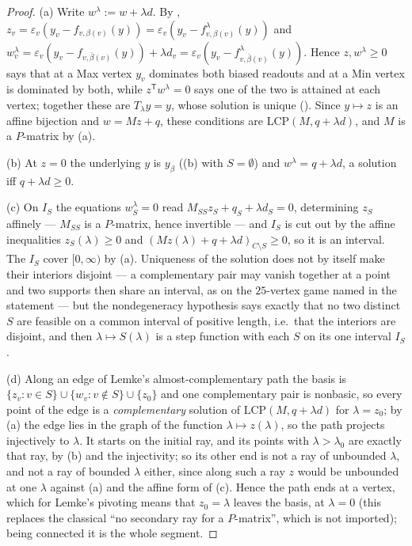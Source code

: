 \documentclass[11pt]{article}
\theoremstyle{plain}
\theoremstyle{definition}
\begin{document}
\begin{proof}
(a) Write $w^{\lambda}:=w+\lambda d$. By ,
$z_v=\varepsilon_v(y_v-f_{v,\beta(v)}(y))=
\varepsilon_v(y_v-f^{\lambda}_{v,\beta(v)}(y))$ and
$w^{\lambda}_v=\varepsilon_v(y_v-f_{v,\bar\beta(v)}(y))+\lambda d_v
=\varepsilon_v(y_v-f^{\lambda}_{v,\bar\beta(v)}(y))$. Hence
$z,w^\lambda\ge0$ says that at a Max vertex $y_v$ dominates both biased
readouts and at a Min vertex is dominated by both, while
$z^{\mathsf T}w^{\lambda}=0$ says one of the two is attained at each vertex;
together these are $T_\lambda y=y$, whose solution is unique
(). Since $y\mapsto z$ is an affine bijection and
$w=Mz+q$, these conditions are $\mathrm{LCP}(M,q+\lambda d)$, and $M$ is a
$P$-matrix by (a).

(b) At $z=0$ the underlying $y$ is $y_\beta$ ((b) with
$S=\emptyset$) and $w^{\lambda}=q+\lambda d$, a solution iff
$q+\lambda d\ge0$.

(c) On $I_S$ the equations $w^{\lambda}_S=0$ read
$M_{SS}z_S+q_S+\lambda d_S=0$, determining $z_S$ affinely --- $M_{SS}$ is a
$P$-matrix, hence invertible --- and $I_S$ is cut out by the affine
inequalities $z_S(\lambda)\ge0$ and
$(Mz(\lambda)+q+\lambda d)_{C\setminus S}\ge0$, so it is an interval.
The $I_S$ cover $[0,\infty)$ by (a). Uniqueness of the solution does not
by itself make their interiors disjoint --- a complementary pair may
vanish together at a point and two supports then share an interval, as
on the $25$-vertex game named in the statement --- but the nondegeneracy
hypothesis says exactly that no two distinct $S$ are feasible on a common
interval of positive length, i.e.\ that the interiors are disjoint, and
then $\lambda\mapsto S(\lambda)$ is a step function with each $S$ on its
one interval $I_S$.

(d) Along an edge of Lemke's almost-complementary path the basis is
$\{z_v:v\in S\}\cup\{w_v:v\notin S\}\cup\{z_0\}$ and one complementary pair
is nonbasic, so every point of the edge is a \emph{complementary} solution of
$\mathrm{LCP}(M,q+\lambda d)$ for $\lambda=z_0$; by (a) the edge lies in the
graph of the function $\lambda\mapsto z(\lambda)$, so the path projects
injectively to $\lambda$. It starts on the initial ray, and its points
with $\lambda>\lambda_0$ are exactly that ray, by (b) and the injectivity;
so its other end is not a ray of unbounded $\lambda$, and not a ray of
bounded $\lambda$ either, since along such a ray $z$ would be unbounded
at one $\lambda$ against (a) and the affine form of (c). Hence the path
ends at a vertex, which for Lemke's pivoting means that $z_0=\lambda$
leaves the basis, at $\lambda=0$ (this replaces the classical ``no
secondary ray for a $P$-matrix'', which is not imported); being connected
it is the whole segment.
\end{proof}
\end{document}

